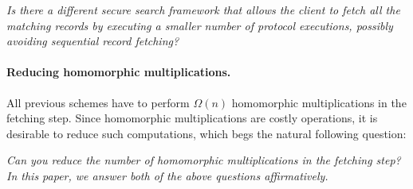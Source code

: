 \medskip

\BI
\item[]
\it
Is there a different secure search framework that allows the client to
fetch all the matching records by executing a smaller number of protocol
executions, possibly avoiding sequential record fetching?
\EI

\paragraph{Reducing homomorphic multiplications.} 
All previous schemes have to perform $\Omega(n)$ homomorphic
multiplications in the fetching step. Since homomorphic multiplications
are costly operations, it is desirable to reduce such computations,
which begs the natural following question: 

\medskip
\BI
\item[]
\it
Can you reduce the number of homomorphic multiplications in the fetching
step? 
\EI
In this paper, we answer both of the above questions affirmatively. 

